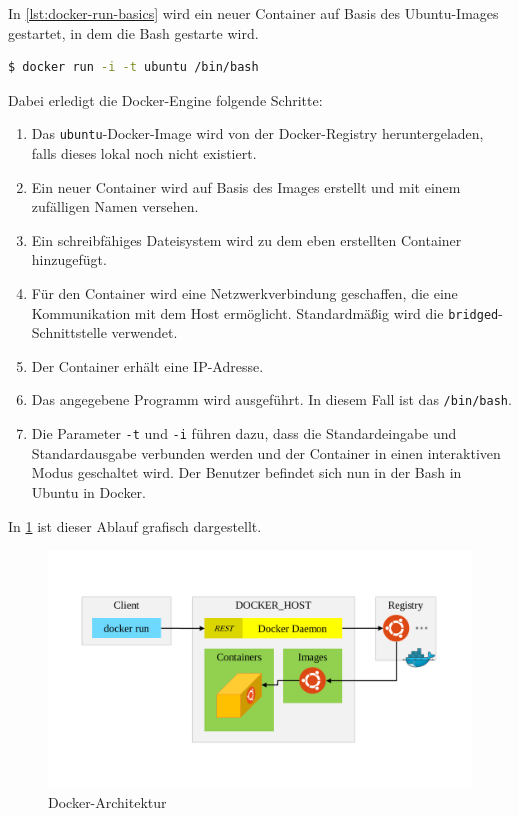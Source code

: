 In \cref{lst:docker-run-basics} wird ein neuer Container auf Basis des Ubuntu-Images gestartet, in dem die Bash gestarte wird.
\begin{lstlisting}[caption=Ubuntu-Bash in Docker, language=bash, label=lst:docker-run-basics]
    $ docker run -i -t ubuntu /bin/bash
\end{lstlisting}
Dabei erledigt die Docker-Engine folgende Schritte:
\begin{enumerate}
    \item Das \texttt{ubuntu}-Docker-Image wird von der Docker-Registry heruntergeladen, falls dieses lokal noch nicht existiert.
    \item Ein neuer Container wird auf Basis des Images erstellt und mit einem zufälligen Namen versehen.
    \item Ein schreibfähiges Dateisystem wird zu dem eben erstellten Container hinzugefügt.
    \item Für den Container wird eine Netzwerkverbindung geschaffen, die eine Kommunikation mit dem Host ermöglicht. Standardmäßig wird die \texttt{bridged}-Schnittstelle verwendet.
    \item Der Container erhält eine IP-Adresse.
    \item Das angegebene Programm wird ausgeführt. In diesem Fall ist das \texttt{/bin/bash}.
    \item Die Parameter \texttt{-t} und \texttt{-i} führen dazu, dass die Standardeingabe und Standardausgabe verbunden werden und der Container in einen interaktiven Modus geschaltet wird. Der Benutzer befindet sich nun in der Bash in Ubuntu in Docker.
\end{enumerate}
In \cref{fig:docker-architektur} ist dieser Ablauf grafisch dargestellt.
\begin{figure}[htbp]
    \centering
    \includegraphics[width=0.9\linewidth,clip]{images/docker-architecture}
    \caption{Docker-Architektur}
\label{fig:docker-architektur}
\end{figure}


